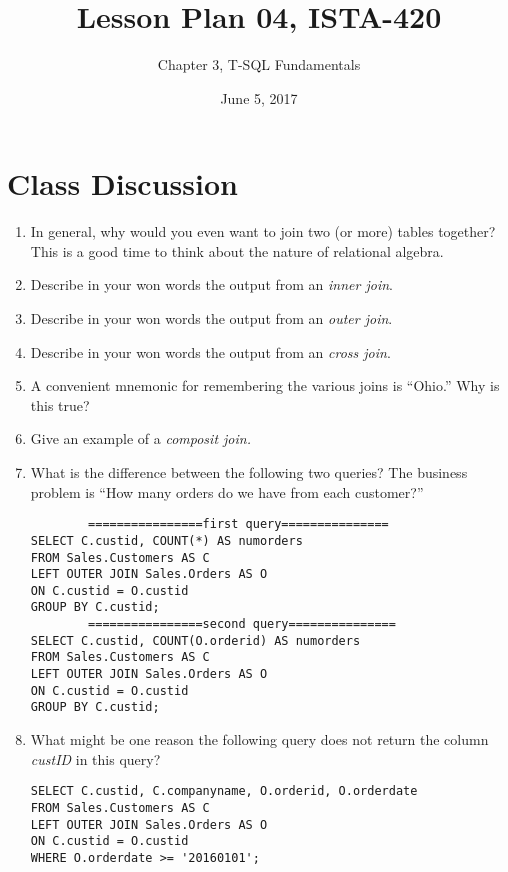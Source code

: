 \documentclass{article}
\title{Lesson Plan 04, ISTA-420}
\author{Chapter 3, T-SQL Fundamentals}
\date{June 5, 2017}
\begin{document}
    

    \maketitle{}

    \section{Class Discussion}

    \begin{enumerate}
        \item In general, why would you even want to join two (or more) tables together? This is a good time to think about the nature of relational algebra.
        \item Describe in your won words the output from an \textit{inner join}.
        \item Describe in your won words the output from an \textit{outer join}.
        \item Describe in your won words the output from an \textit{cross join}.
        \item A convenient mnemonic for remembering the various joins is ``Ohio.'' Why is this true?
        \item Give an example of a \textit{composit join.}
        \item What is the difference between the following two queries? The business problem is ``How many orders do we have from each customer?''

        \begin{verbatim}
        ================first query===============
SELECT C.custid, COUNT(*) AS numorders
FROM Sales.Customers AS C
LEFT OUTER JOIN Sales.Orders AS O
ON C.custid = O.custid
GROUP BY C.custid;
        ================second query===============
SELECT C.custid, COUNT(O.orderid) AS numorders
FROM Sales.Customers AS C
LEFT OUTER JOIN Sales.Orders AS O
ON C.custid = O.custid
GROUP BY C.custid;
        \end{verbatim}
    \item What might be one reason the following query does not return the column \textit{custID} in this query?

        \begin{verbatim}
SELECT C.custid, C.companyname, O.orderid, O.orderdate
FROM Sales.Customers AS C
LEFT OUTER JOIN Sales.Orders AS O
ON C.custid = O.custid
WHERE O.orderdate >= '20160101';
        \end{verbatim}

    \end{enumerate}
\end{document}
